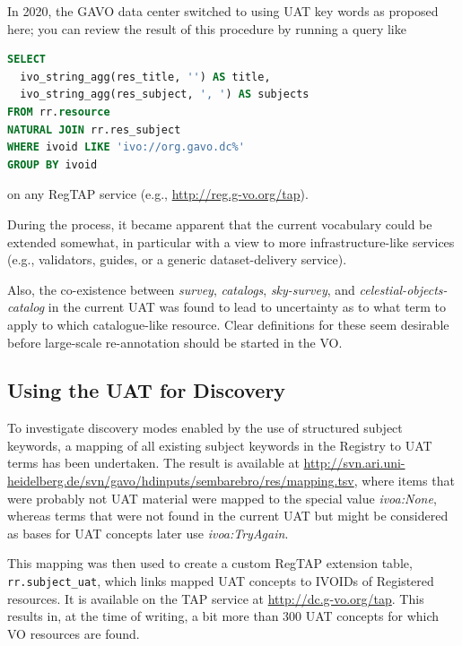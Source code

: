 \documentclass[11pt,a4paper]{ivoa}
\newcommand{\vocterm}[1]{\emph{\color{termcolor}#1}}
\begin{document}
In 2020, the GAVO data center switched to using UAT key words as
proposed here; you can review the result of this procedure by running
a query like
\begin{lstlisting}[language=SQL]
SELECT 
  ivo_string_agg(res_title, '') AS title,
  ivo_string_agg(res_subject, ', ') AS subjects
FROM rr.resource
NATURAL JOIN rr.res_subject
WHERE ivoid LIKE 'ivo://org.gavo.dc%'
GROUP BY ivoid
\end{lstlisting}
on any RegTAP service (e.g., \url{http://reg.g-vo.org/tap}).

During the process, it became apparent that the current vocabulary could
be extended somewhat, in particular with a view to more
infrastructure-like services (e.g., validators, guides, or a generic
dataset-delivery service).

Also, the co-existence between \vocterm{survey}, \vocterm{catalogs},
\vocterm{sky-survey}, and \vocterm{celestial-objects-catalog} in the
current UAT was found to lead to uncertainty as to what term to apply to
which catalogue-like resource.  Clear definitions for these 
seem desirable before large-scale re-annotation should be started in the
VO.

\subsection{Using the UAT for Discovery}

To investigate discovery modes enabled by the use of structured subject
keywords, a mapping of all existing subject keywords in the Registry to
UAT terms has been undertaken.  The result is available at
\url{http://svn.ari.uni-heidelberg.de/svn/gavo/hdinputs/sembarebro/res/mapping.tsv},
where items that were probably not UAT material were mapped to the
special value \emph{ivoa:None}, whereas terms that were not found in the
current UAT but might be considered as bases for UAT concepts later use
\emph{ivoa:TryAgain}.

This mapping was then used to create a custom RegTAP extension table,
\verb|rr.subject_uat|, which links mapped UAT concepts to IVOIDs of
Registered resources.  It is available on the TAP service at
\url{http://dc.g-vo.org/tap}.  This results in, at the time of writing,
a bit more than 300 UAT concepts for which VO resources are found.
\end{document}
